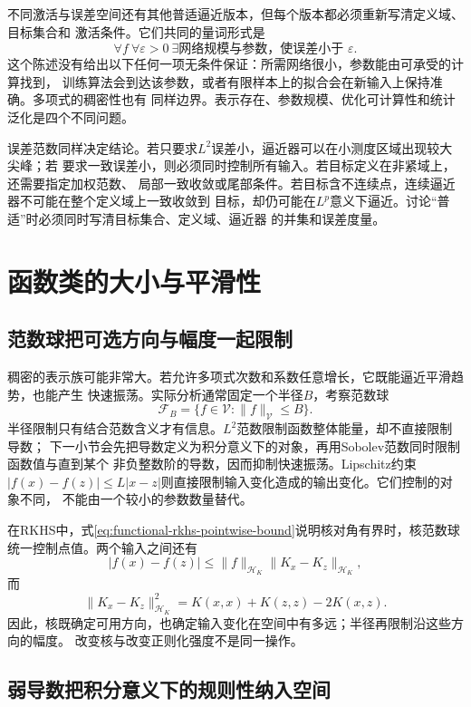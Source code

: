 不同激活与误差空间还有其他普适逼近版本，但每个版本都必须重新写清定义域、目标集合和
激活条件。它们共同的量词形式是
\[
  \forall f\ \forall\varepsilon>0\
  \exists\text{网络规模与参数，使误差小于 }\varepsilon.
\]
这个陈述没有给出以下任何一项无条件保证：所需网络很小，参数能由可承受的计算找到，
训练算法会到达该参数，或者有限样本上的拟合会在新输入上保持准确。多项式的稠密性也有
同样边界。表示存在、参数规模、优化可计算性和统计泛化是四个不同问题。

误差范数同样决定结论。若只要求$L^2$误差小，逼近器可以在小测度区域出现较大尖峰；若
要求一致误差小，则必须同时控制所有输入。若目标定义在非紧域上，还需要指定加权范数、
局部一致收敛或尾部条件。若目标含不连续点，连续逼近器不可能在整个定义域上一致收敛到
目标，却仍可能在$L^p$意义下逼近。讨论“普适”时必须同时写清目标集合、定义域、逼近器
的并集和误差度量。

\section{函数类的大小与平滑性}
\label{sec:functional-class-size-smoothness}

\subsection{范数球把可选方向与幅度一起限制}

稠密的表示族可能非常大。若允许多项式次数和系数任意增长，它既能逼近平滑趋势，也能产生
快速振荡。实际分析通常固定一个半径$B$，考察范数球
\[
  \mathcal{F}_B
  =
  \{f\in\mathcal{V}:\lVert f\rVert_{\mathcal{V}}\leq B\}.
\]
半径限制只有结合范数含义才有信息。$L^2$范数限制函数整体能量，却不直接限制导数；
下一小节会先把导数定义为积分意义下的对象，再用Sobolev范数同时限制函数值与直到某个
非负整数阶的导数，因而抑制快速振荡。Lipschitz约束
$|f(x)-f(z)|\leq L|x-z|$则直接限制输入变化造成的输出变化。它们控制的对象不同，
不能由一个较小的参数数量替代。

在RKHS中，式\eqref{eq:functional-rkhs-pointwise-bound}说明核对角有界时，核范数球
统一控制点值。两个输入之间还有
\begin{equation}
  |f(x)-f(z)|
  \leq
  \lVert f\rVert_{\mathcal{H}_K}
  \lVert K_x-K_z\rVert_{\mathcal{H}_K},
  \label{eq:functional-rkhs-modulus-bound}
\end{equation}
而
\[
  \lVert K_x-K_z\rVert_{\mathcal{H}_K}^2
  =
  K(x,x)+K(z,z)-2K(x,z).
\]
因此，核既确定可用方向，也确定输入变化在空间中有多远；半径再限制沿这些方向的幅度。
改变核与改变正则化强度不是同一操作。

\subsection{弱导数把积分意义下的规则性纳入空间}


